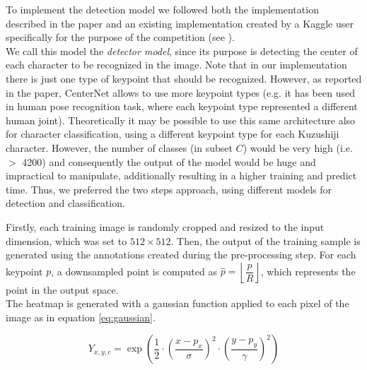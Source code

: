 To implement the detection model we followed both the implementation described in the paper and an existing implementation created by a Kaggle user specifically for the purpose of the competition (see \cite{k-mat2019}).\\ We call this model the \textit{detector model}, since its purpose is detecting the center of each character to be recognized in the image. Note that in our implementation there is just one type of keypoint that should be recognized. However, as reported in the paper, CenterNet allows to use more keypoint types (e.g. it has been used in human pose recognition task, where each keypoint type represented a different human joint). Theoretically it may be possible to use this same architecture also for character classification, using a different keypoint type for each Kuzushiji character. However, the number of classes (in subset $C$) would be very high (i.e. $>$ 4200) and consequently the output of the model would be huge and impractical to manipulate, additionally resulting in a higher training and predict time. Thus, we preferred the two steps approach, using different models for detection and classification.

\label{ssssec:inputsamples}

Firstly, each training image is randomly cropped and resized to the input dimension, which was set to $512 \times 512$. Then, the output of the training sample is generated using the annotations created during the pre-processing step. For each keypoint $p$, a downsampled point is computed as $\hat{p}=\left\lfloor \dfrac{p}{R} \right\rfloor$, which represents the point in the output space.\\
The heatmap is generated with a gaussian function applied to each pixel of the image as in equation \ref{eq:gaussian}.

\begin{equation}\label{eq:gaussian}
	Y_{x,y,c}=\exp\left(\dfrac{1}{2} \cdot \left(\frac{x-p_x}{\sigma}\right)^2 \cdot \left(\frac{y-p_y}{\gamma}\right)^2 \right)
\end{equation}

